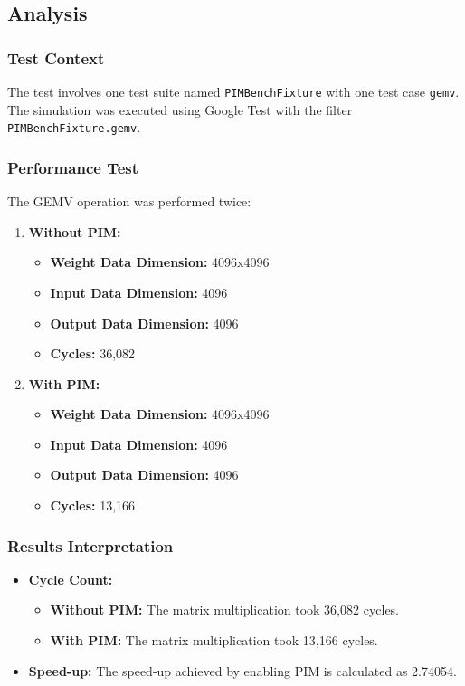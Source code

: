 \documentclass[12pt]{article}
\begin{document}
\subsection{Analysis}

\subsubsection{Test Context}
The test involves one test suite named \texttt{PIMBenchFixture} with one test case \texttt{gemv}. The simulation was executed using Google Test with the filter \texttt{PIMBenchFixture.gemv}.

\subsubsection{Performance Test}
The GEMV operation was performed twice:
\begin{enumerate}
	\item \textbf{Without PIM:}
	\begin{itemize}
		\item \textbf{Weight Data Dimension:} 4096x4096
		\item \textbf{Input Data Dimension:} 4096
		\item \textbf{Output Data Dimension:} 4096
		\item \textbf{Cycles:} 36,082
	\end{itemize}
	\item \textbf{With PIM:}
	\begin{itemize}
		\item \textbf{Weight Data Dimension:} 4096x4096
		\item \textbf{Input Data Dimension:} 4096
		\item \textbf{Output Data Dimension:} 4096
		\item \textbf{Cycles:} 13,166
	\end{itemize}
\end{enumerate}

\subsubsection{Results Interpretation}
\begin{itemize}
	\item \textbf{Cycle Count:}
	\begin{itemize}
		\item \textbf{Without PIM:} The matrix multiplication took 36,082 cycles.
		\item \textbf{With PIM:} The matrix multiplication took 13,166 cycles.
	\end{itemize}
	\item \textbf{Speed-up:} The speed-up achieved by enabling PIM is calculated as 2.74054.
\end{itemize}
\end{document}

